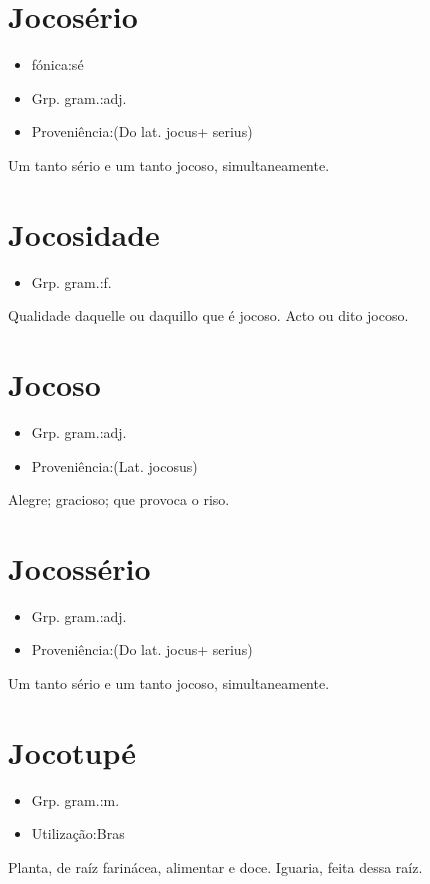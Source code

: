 \documentclass{article}
\begin{document}
\section{Jocosério}
\begin{itemize}
\item {fónica:sé}
\end{itemize}
\begin{itemize}
\item {Grp. gram.:adj.}
\end{itemize}
\begin{itemize}
\item {Proveniência:(Do lat. \textunderscore jocus\textunderscore  + \textunderscore serius\textunderscore )}
\end{itemize}
Um tanto sério e um tanto jocoso, simultaneamente.
\section{Jocosidade}
\begin{itemize}
\item {Grp. gram.:f.}
\end{itemize}
Qualidade daquelle ou daquillo que é jocoso.
Acto ou dito jocoso.
\section{Jocoso}
\begin{itemize}
\item {Grp. gram.:adj.}
\end{itemize}
\begin{itemize}
\item {Proveniência:(Lat. \textunderscore jocosus\textunderscore )}
\end{itemize}
Alegre; gracioso; que provoca o riso.
\section{Jocossério}
\begin{itemize}
\item {Grp. gram.:adj.}
\end{itemize}
\begin{itemize}
\item {Proveniência:(Do lat. \textunderscore jocus\textunderscore  + \textunderscore serius\textunderscore )}
\end{itemize}
Um tanto sério e um tanto jocoso, simultaneamente.
\section{Jocotupé}
\begin{itemize}
\item {Grp. gram.:m.}
\end{itemize}
\begin{itemize}
\item {Utilização:Bras}
\end{itemize}
Planta, de raíz farinácea, alimentar e doce.
Iguaria, feita dessa raíz.
\end{document}
